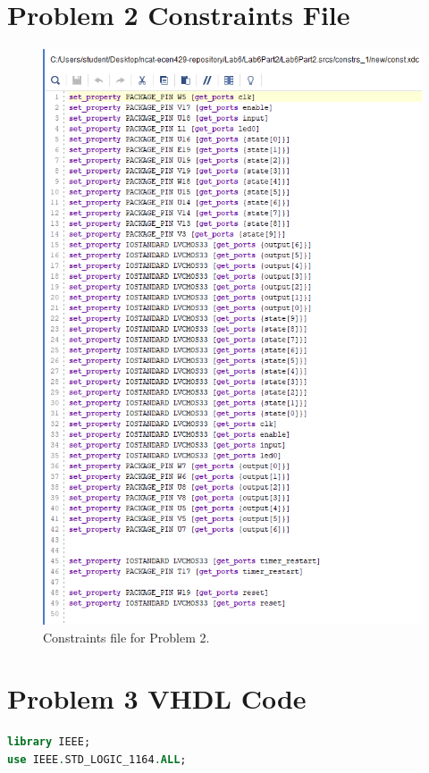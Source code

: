 \documentclass[11pt]{article}
\begin{document}
\begin{appendices}
\section{Problem 2 Constraints File}
\begin{center}
\begin{figure}[H]
	\includegraphics[scale=1]{./images/Lab6Part2Const.png}
	\caption{\label{fig:Prob1Const}Constraints file for Problem 2.}
\end{figure}
\end{center}

\section{Problem 3 VHDL Code}
\begin{lstlisting}[language=VHDL]
library IEEE;
use IEEE.STD_LOGIC_1164.ALL;


\end{lstlisting}
\end{appendices}
\end{document}
